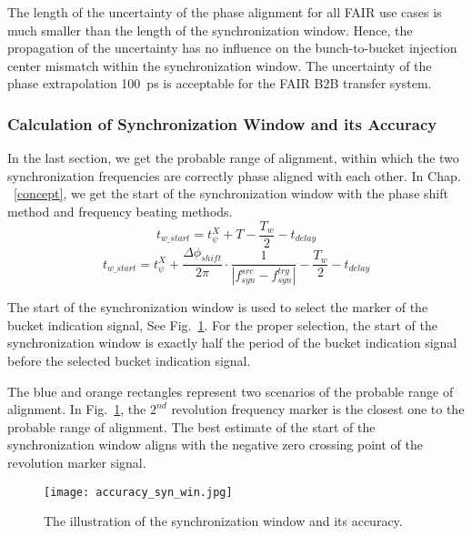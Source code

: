 \begin{itemize}
The length of the uncertainty of the phase alignment for all FAIR use cases is much smaller than the length of the synchronization window. Hence, the propagation of the uncertainty has no influence on the bunch-to-bucket injection center mismatch within the synchronization window. The uncertainty of the phase extrapolation \SI{100}{ps} is acceptable for the FAIR B2B transfer system.

\end{itemize}

\subsubsection{Calculation of Synchronization Window and its Accuracy}
In the last section, we get the probable range of alignment, within which the two synchronization frequencies are correctly phase aligned with each other. In Chap. ~\ref{concept}, we get the start of the synchronization window with the phase shift method and frequency beating methods.
\begin{equation}
t_\mathit{w\_start}=t_\psi^\mathit{X}+T-\frac{T_w}{2}-t_\mathit{delay}\label{syn_win_start2}
\end{equation}
\begin{equation}
t_\mathit{w\_start}= t_\psi^\mathit{X}+\frac{\Delta \phi_\mathit{shift}}{2\pi}\cdot\frac{1}{|f_{\mathit{syn}}^\mathit{src}-f_{\mathit{syn}}^\mathit{trg}|}-\frac{T_w}{2}-t_\mathit{delay}\label{syn_win_start3}
\end{equation}

The start of the synchronization window is used to select the marker of the bucket indication signal, See Fig.~\ref{accuracy_syn_win}. For the proper selection, the start of the synchronization window is exactly half the period of the bucket indication signal before the selected bucket indication signal. 

The blue and orange rectangles represent two scenarios of the probable range of alignment. In Fig.~\ref{accuracy_syn_win}, the $2^{nd}$ revolution frequency marker is the closest one to the probable range of alignment. The best estimate of the start of the synchronization window aligns with the negative zero crossing point of the revolution marker signal.



\begin{figure}[!htb]
   \centering   
   \texttt{[image: accuracy\_syn\_win.jpg]}
   \caption{The illustration of the synchronization window and its accuracy.}
   \label{accuracy_syn_win}
\end{figure}

